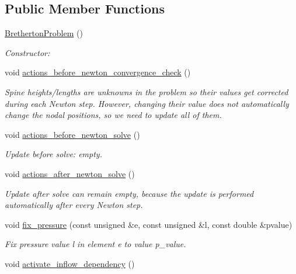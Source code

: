 \subsection*{Public Member Functions}
\begin{DoxyCompactItemize}
\item 
\hyperlink{classBrethertonProblem_a207cdfe4cf60e83257e759b1ac15e5eb}{Bretherton\+Problem} ()
\begin{DoxyCompactList}\small\item\em Constructor\+: \end{DoxyCompactList}\item 
void \hyperlink{classBrethertonProblem_a6a3e76e4900715d8c2fd15d0e350d724}{actions\+\_\+before\+\_\+newton\+\_\+convergence\+\_\+check} ()
\begin{DoxyCompactList}\small\item\em Spine heights/lengths are unknowns in the problem so their values get corrected during each Newton step. However, changing their value does not automatically change the nodal positions, so we need to update all of them. \end{DoxyCompactList}\item 
void \hyperlink{classBrethertonProblem_a7112e0efe4c0cd0269cf47f02df4fe22}{actions\+\_\+before\+\_\+newton\+\_\+solve} ()
\begin{DoxyCompactList}\small\item\em Update before solve\+: empty. \end{DoxyCompactList}\item 
void \hyperlink{classBrethertonProblem_a2e84e3ce784b0f0de5eeefe1175d48ff}{actions\+\_\+after\+\_\+newton\+\_\+solve} ()
\begin{DoxyCompactList}\small\item\em Update after solve can remain empty, because the update is performed automatically after every Newton step. \end{DoxyCompactList}\item 
void \hyperlink{classBrethertonProblem_aa4c346d4dc8d7d24147076d281d181e9}{fix\+\_\+pressure} (const unsigned \&e, const unsigned \&l, const double \&pvalue)
\begin{DoxyCompactList}\small\item\em Fix pressure value l in element e to value p\+\_\+value. \end{DoxyCompactList}\item 
void \hyperlink{classBrethertonProblem_a04257edfb80f2ff3bf865442d9eb01fb}{activate\+\_\+inflow\+\_\+dependency} ()

\end{DoxyCompactItemize}
